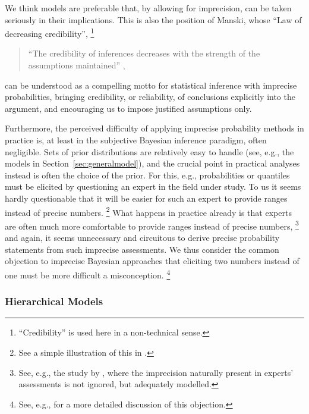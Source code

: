 We think models are preferable that, by allowing for imprecision, can be taken seriously in their implications.
This is also the position of Manski, whose ``Law of decreasing credibility'',%
\footnote{``Credibility'' is used here in a non-technical sense.}
\begin{quote}
``The credibility of inferences decreases with the strength of the assumptions maintained'' \parencite[p. 1]{2003:manski},
\end{quote}
can be understood as a compelling motto for statistical inference with imprecise probabilities,
bringing credibility, or reliability, of conclusions explicitly into the argument,
and encouraging us to impose justified assumptions only.

Furthermore, the perceived difficulty of applying imprecise probability methods in practice
is, at least in the subjective Bayesian inference paradigm, often negligible.
Sets of prior distributions are relatively easy to handle (see, e.g., the models in Section~\ref{sec:generalmodel}),
and the crucial point in practical analyses instead is often the choice of the prior.
For this, e.g., probabilities or quantiles must be elicited
by questioning an expert in the field under study.
To us it seems hardly questionable that it will be easier for such an expert
to provide ranges instead of precise numbers.%
\footnote{See a simple illustration of this in \textcite[\S 5.8, footnote~7, p.~535]{1991:walley}.}
What happens in practice already is that experts are often much more comfortable to provide ranges instead of precise numbers,%
\footnote{See, e.g., the study by \textcite{2011:rinderknecht},
where the imprecision naturally present in experts' assessments is not ignored,
but adequately modelled.}
and again, it seems unnecessary and circuitous to derive precise probability statements
from such imprecise assessments.
We thus consider the common objection to imprecise Bayesian approaches
that eliciting two numbers instead of one must be more difficult a misconception.%
\footnote{See, e.g., \textcite[\S 5.8.2]{1991:walley} for a more detailed discussion of this objection.}

\subsubsection{Hierarchical Models}
\label{sec:hierarchical}

